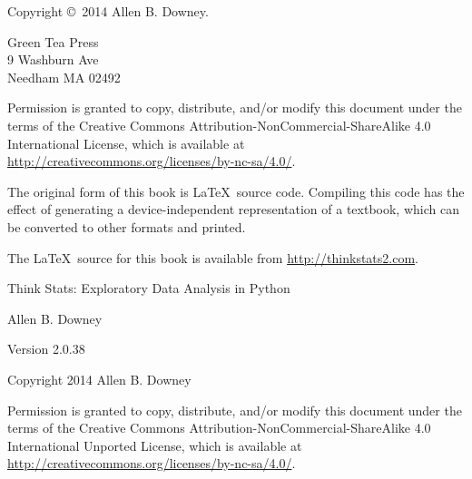 \documentclass[12pt]{book}
\newcommand{\thetitle}{Think Stats}
\newcommand{\thesubtitle}{Exploratory Data Analysis in Python}
\newcommand{\theversion}{2.0.38}
\begin{document}
\begin{latexonly}
\begin{flushright}
\end{flushright}


\pagebreak
\thispagestyle{empty}

{\small
Copyright \copyright ~2014 Allen B. Downey.


\vspace{0.2in}

\begin{flushleft}
Green Tea Press       \\
9 Washburn Ave \\
Needham MA 02492
\end{flushleft}

Permission is granted to copy, distribute, and/or modify this document
under the terms of the Creative Commons
Attribution-NonCommercial-ShareAlike 4.0 International License, which
is available at
\url{http://creativecommons.org/licenses/by-nc-sa/4.0/}.

The original form of this book is \LaTeX\ source code.  Compiling this
code has the effect of generating a device-independent representation
of a textbook, which can be converted to other formats and printed.

The \LaTeX\ source for this book is available from
\url{http://thinkstats2.com}.

\vspace{0.2in}

} %

\end{latexonly}



\begin{htmlonly}


{\Large \thetitle: \thesubtitle}

{\large Allen B. Downey}

Version \theversion

\vspace{0.25in}

Copyright 2014 Allen B. Downey

\vspace{0.25in}

Permission is granted to copy, distribute, and/or modify this document
under the terms of the Creative Commons 
Attribution-NonCommercial-ShareAlike 4.0 International
Unported License, which is available at
\url{http://creativecommons.org/licenses/by-nc-sa/4.0/}.

\setcounter{chapter}{-1}

\end{htmlonly}
\end{document}
